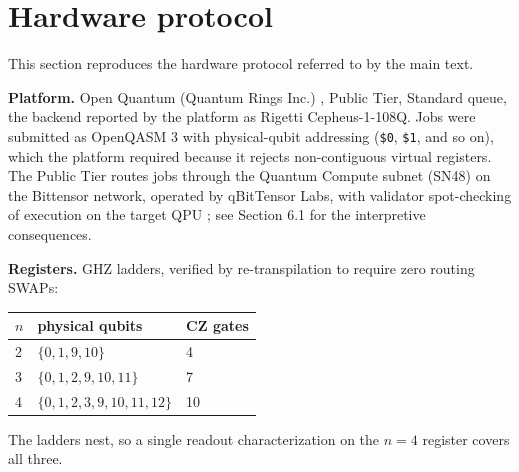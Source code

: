 %
%

\section{Hardware protocol}\label{supp:protocol}

This section reproduces the hardware protocol referred to by the main text.

\textbf{Platform.} Open Quantum (Quantum Rings Inc.)
\cite{wold2025openquantum}, Public Tier, Standard queue, the backend reported by the platform as
Rigetti Cepheus-1-108Q. Jobs were submitted as OpenQASM 3 with physical-qubit
addressing (\texttt{\$0}, \texttt{\$1}, and so on), which the platform
required because it rejects non-contiguous virtual registers. The Public
Tier routes jobs through the Quantum Compute subnet (SN48) on the
Bittensor network, operated by qBitTensor Labs, with validator
spot-checking of execution on the target QPU \cite{wold2025openquantum};
see Section 6.1 for the interpretive consequences.

\textbf{Registers.} GHZ ladders, verified by re-transpilation to require
zero routing SWAPs:

\begin{table}[htbp]
\centering
\setlength{\tabcolsep}{10pt}
\begin{tabular}{@{}lll@{}}
\toprule
\(n\) & physical qubits & CZ gates \\
\midrule
2 & \(\{0, 1, 9, 10\}\) & 4 \\
3 & \(\{0, 1, 2, 9, 10, 11\}\) & 7 \\
4 & \(\{0, 1, 2, 3, 9, 10, 11, 12\}\) & 10 \\
\bottomrule
\end{tabular}
\end{table}

The ladders nest, so a single readout characterization on the \(n=4\)
register covers all three.

